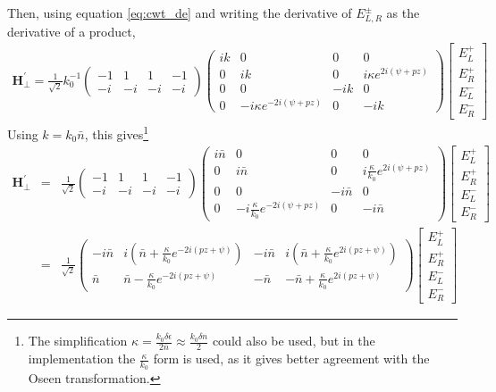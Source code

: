 Then, using equation \ref{eq:cwt_de} and writing the derivative of $E_{L,R}^{\pm}$ as the derivative of a product,
\begin{eqnarray}
\mathbf{H_\perp^\prime} = \frac{1}{\sqrt{2}}k_0^{-1}\begin{pmatrix}-1 & 1 & 1 & -1\\-i & -i & -i & -i\end{pmatrix}\begin{pmatrix}
ik & 0 & 0 & 0\\
0 & ik & 0 & i\kappa e^{2i(\psi+pz)}\\
0 & 0 & -ik & 0\\
0 & -i\kappa e^{-2i(\psi + pz)} & 0 & -ik
\end{pmatrix}\begin{bmatrix}
E_L^+\\E_R^+\\E_L^-\\E_R^-
\end{bmatrix}
\end{eqnarray}
Using $k=k_0\bar{n}$, this gives\footnote{The simplification $\kappa=\frac{k_0\delta\epsilon}{2\bar{n}}\approx\frac{k_0\delta n}{2}$ could also be used, but in the implementation the $\frac{\kappa}{k_0}$ form is used, as it gives better agreement with the Oseen transformation.}
\begin{eqnarray}
\mathbf{H_\perp^\prime} &=& \frac{1}{\sqrt{2}}\begin{pmatrix}-1 & 1 & 1 & -1\\-i & -i & -i & -i\end{pmatrix}\begin{pmatrix}
i\bar{n} & 0 & 0 & 0\\
0 & i\bar{n} & 0 & i\frac{\kappa}{k_0}e^{2i(\psi+pz)}\\
0 & 0 & -i\bar{n} & 0\\
0 & -i\frac{\kappa}{k_0} e^{-2i(\psi + pz)} & 0 & -i\bar{n}
\end{pmatrix}\begin{bmatrix}
E_L^+\\E_R^+\\E_L^-\\E_R^-
\end{bmatrix}\\
&=&\frac{1}{\sqrt{2}}\begin{pmatrix}
- i \bar{n}&i \left(\bar{n} + \frac{\kappa}{k_0} e^{- 2 i \left(p z + \psi\right)}\right)&- i \bar{n}&i \left(\bar{n} + \frac{\kappa}{k_0} e^{2 i \left(p z + \psi\right)}\right)\\
\bar{n}&\bar{n} - \frac{\kappa}{k_0} e^{- 2 i \left(p z + \psi\right)}&- \bar{n}&- \bar{n} + \frac{\kappa}{k_0} e^{2 i \left(p z + \psi\right)}
\end{pmatrix}\begin{bmatrix}
E_L^+\\E_R^+\\E_L^-\\E_R^-
\end{bmatrix}
\end{eqnarray}
